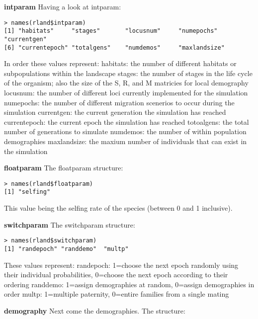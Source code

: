 \documentclass{article}
\begin{document}
\begin{list}{}{\setlength{\labelsep}{10pt} \setlength{\leftmargin}{40pt}}
\item[\textbf{intparam}] 
Having a look at intparam:

\begin{verbatim}
> names(rland$intparam)
[1] "habitats"     "stages"       "locusnum"     "numepochs"    "currentgen"
[6] "currentepoch" "totalgens"    "numdemos"     "maxlandsize"
\end{verbatim}

In order these values represent:
habitats: the number of different habitats or subpopulations within the landscape
stages: the number of stages in the life cycle of the organism; also the size of the S, R, and M matricies for local demography
locusnum: the number of different loci currently implemented for the simulation
numepochs: the number of different migration scenerios to occur during the simulation
currentgen: the current generation the simulation has reached
currentepoch: the current epoch the simulation has reached
totoalgens: the total number of generations to simulate
numdemos: the number of within population demographies
maxlandsize: the maxium number of individuals that can exist in the simulation

\item[\textbf{floatparam}] The floatparam structure:

\begin{verbatim}
> names(rland$floatparam)
[1] "selfing"
\end{verbatim}

This value being the selfing rate of the species (between 0 and 1 inclusive).

\item[\textbf{switchparam}] The switchparam structure:

\begin{verbatim}
> names(rland$switchparam)
[1] "randepoch" "randdemo"  "multp"
\end{verbatim}

These values represent:
randepoch: 1=choose the next epoch randomly using their individual probabilities, 0=choose the next epoch according to their ordering
randdemo: 1=assign demographies at random, 0=assign demographies in order
multp: 1=multiple paternity, 0=entire families from a single mating

\item[\textbf{demography}] Next come the demographies.  The structure:


\end{list}
\end{document}
